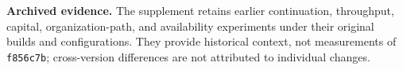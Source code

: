 \noindent\textbf{Archived evidence.}
The supplement retains earlier continuation, throughput, capital,
organization-path, and availability experiments under their original
builds and configurations. They provide historical context, not
measurements of \texttt{f856c7b}; cross-version differences are not
attributed to individual changes.
